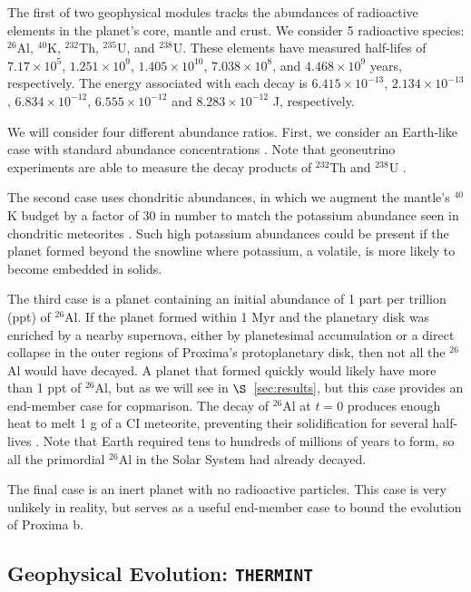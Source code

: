 \documentclass[preprint,12pt]{aastex}
\def\eg{{\it e.g.\ }}
\def\thermint{\texttt{\footnotesize{THERMINT}}\xspace}
\begin{document}
The first of two geophysical modules tracks the abundances of
radioactive elements in the planet's core, mantle and crust. We
consider 5 radioactive species: $^{26}$Al, $^{40}$K, $^{232}$Th,
$^{235}$U, and $^{238}$U. These elements have measured half-lifes of
$7.17 \times 10^5$, $1.251 \times 10^9$, $1.405 \times 10^{10}$,
$7.038 \times 10^8$, and $4.468 \times 10^9$ years, respectively. The
energy associated with each decay is $6.415 \times 10^{-13}$,
$2.134 \times 10^{-13}$, $6.834 \times 10^{-12}$,
$6.555 \times 10^{-12}$ and $8.283 \times 10^{-12}$ J, respectively.

We will consider four different abundance ratios. First, we consider an
Earth-like case with standard abundance concentrations
\citep[\eg][]{Korenaga03,Arevalo09,Huang13}. Note that geoneutrino
experiments are able to measure the decay products of $^{232}$Th and
$^{238}$U \citep{Raghavan98,Araki05,Dye10}.

The second case uses chondritic abundances, in which we augment the
mantle's $^{40}$K budget by a factor of 30 in number to match the
potassium abundance seen in chondritic meteorites
\citep{AndersGrevesse89,Arevalo09}. Such high potassium abundances could be
present if the planet formed beyond the snowline where potassium, a
volatile, is more likely to become embedded in solids.

The third case is a planet containing an initial abundance of 1 part
per trillion (ppt) of $^{26}$Al. If the planet formed within 1 Myr and 
the planetary disk was enriched by a nearby supernova,
either by planetesimal accumulation or a direct collapse in the outer
regions of Proxima's protoplanetary disk, then not all the $^{26}$Al
would have decayed. A planet that formed quickly would likely have
more than 1 ppt of $^{26}$Al, but as we will see in
$\S$~\ref{sec:results}, but this case provides an end-member case for
copmarison. The decay of $^{26}$Al at $t=0$ produces enough heat to melt 1 g
of a CI meteorite, preventing their solidification for several
half-lives \citep{HeveySanders06}. Note that Earth required tens to
hundreds of millions of years to form, so all the primordial $^{26}$Al
in the Solar System had already decayed.

The final case is an inert planet with no radioactive particles. This
case is very unlikely in reality, but serves as a useful end-member
case to bound the evolution of Proxima b.

\subsection{Geophysical Evolution: \thermint}
\label{sec:models:thermint}
\end{document}
